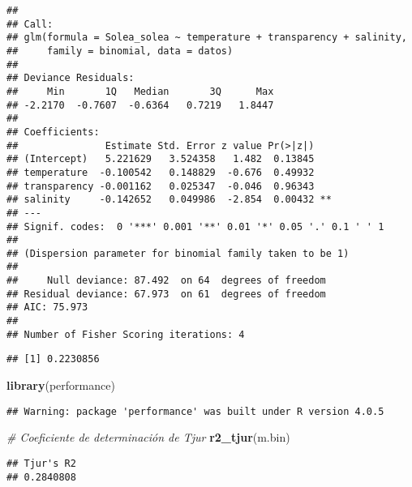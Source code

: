\documentclass[
]{book}
\newenvironment{Shaded}{\begin{snugshade}}{\end{snugshade}}
\newcommand{\CommentTok}[1]{\textcolor[rgb]{0.56,0.35,0.01}{\textit{#1}}}
\newcommand{\DecValTok}[1]{\textcolor[rgb]{0.00,0.00,0.81}{#1}}
\newcommand{\KeywordTok}[1]{\textcolor[rgb]{0.13,0.29,0.53}{\textbf{#1}}}
\newcommand{\NormalTok}[1]{#1}
\newcommand{\OperatorTok}[1]{\textcolor[rgb]{0.81,0.36,0.00}{\textbf{#1}}}
\newcommand{\StringTok}[1]{\textcolor[rgb]{0.31,0.60,0.02}{#1}}
\begin{document}
\begin{verbatim}
## 
## Call:
## glm(formula = Solea_solea ~ temperature + transparency + salinity, 
##     family = binomial, data = datos)
## 
## Deviance Residuals: 
##     Min       1Q   Median       3Q      Max  
## -2.2170  -0.7607  -0.6364   0.7219   1.8447  
## 
## Coefficients:
##               Estimate Std. Error z value Pr(>|z|)   
## (Intercept)   5.221629   3.524358   1.482  0.13845   
## temperature  -0.100542   0.148829  -0.676  0.49932   
## transparency -0.001162   0.025347  -0.046  0.96343   
## salinity     -0.142652   0.049986  -2.854  0.00432 **
## ---
## Signif. codes:  0 '***' 0.001 '**' 0.01 '*' 0.05 '.' 0.1 ' ' 1
## 
## (Dispersion parameter for binomial family taken to be 1)
## 
##     Null deviance: 87.492  on 64  degrees of freedom
## Residual deviance: 67.973  on 61  degrees of freedom
## AIC: 75.973
## 
## Number of Fisher Scoring iterations: 4
\end{verbatim}

\begin{Shaded}
\end{Shaded}

\begin{verbatim}
## [1] 0.2230856
\end{verbatim}

\begin{Shaded}
\begin{Highlighting}[]
\KeywordTok{library}\NormalTok{(performance)}
\end{Highlighting}
\end{Shaded}

\begin{verbatim}
## Warning: package 'performance' was built under R version 4.0.5
\end{verbatim}

\begin{Shaded}
\begin{Highlighting}[]
\CommentTok{# Coeficiente de determinación de Tjur}
\KeywordTok{r2_tjur}\NormalTok{(m.bin) }
\end{Highlighting}
\end{Shaded}

\begin{verbatim}
## Tjur's R2 
## 0.2840808
\end{verbatim}
\end{document}
